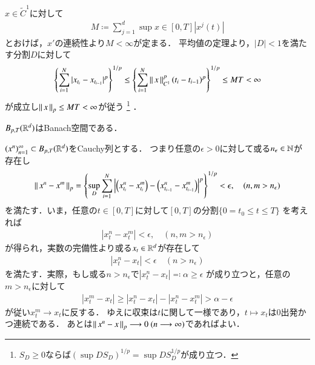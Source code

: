 \begin{prf}
	$x \in \tilde{C}^1$に対して
	\begin{align}
		M \coloneqq \sum_{j=1}^{d} \sup{x \in [0,T]}{|x^j(t)|}
	\end{align}
	とおけば，$x'$の連続性より$M < \infty$が定まる．
	平均値の定理より，$|D| < 1$を満たす分割$D$に対して
	\begin{align}
		\left\{ \sum_{i=1}^{N} |x_{t_i} - x_{t_{i-1}}|^p \right\}^{1/p}
		\leq \left\{ \sum_{i=1}^{N} \left\|\, x\, \right\|_{C^1}^p (t_i - t_{i-1})^p \right\}^{1/p}
		\leq M T < \infty
	\end{align}
	が成立し$\left\|\, x\, \right\|_{p} \leq MT < \infty$が従う
	\footnote{
		$S_D \geq 0$ならば$(\sup{D}S_D)^{1/p} = \sup{D}S_D^{1/p}$が成り立つ．
	}
	．
\end{prf}

\begin{screen}
	\begin{thm}
		$B_{p,T}(\mathbb{R}^d)$はBanach空間である．
	\end{thm}
\end{screen}

\begin{prf}
	$(x^n)_{n=1}^{\infty} \subset B_{p,T}(\mathbb{R}^d)$をCauchy列とする．
	つまり任意の$\epsilon > 0$に対して或る$n_\epsilon \in \mathbb{N}$が存在し
	\begin{align}
		\left\|\, x^n - x^m\, \right\|_{p}
		= \left\{ \operatorname*{sup}_{D} \sum_{i=1}^{N} 
		\left| \left( x^n_{t_i} - x^m_{t_i} \right) 
		- \left(x^n_{t_{i-1}} - x^m_{t_{i-1}} \right) \right|^p \right\}^{1/p} < \epsilon,
		\quad (n,m > n_\epsilon)
	\end{align}
	を満たす．いま，任意の$t \in [0,T]$に対して$[0,T]$の分割$\{0=t_0 \leq t \leq T\}$
	を考えれば
	\begin{align}
		|x^n_t - x^m_t| < \epsilon,
		\quad (n,m > n_\epsilon)
	\end{align}
	が得られ，実数の完備性より或る$x_t \in \mathbb{R}^d$が存在して
	\begin{align}
		|x^n_t - x_t| < \epsilon
		\quad (n > n_\epsilon)
	\end{align}
	を満たす．実際，もし或る$n > n_\epsilon$で$|x^n_t - x_t| \eqqcolon \alpha \geq \epsilon$
	が成り立つと，任意の$m > n_\epsilon$に対して
	\begin{align}
		|x^m_t - x_t| \geq |x^n_t - x_t| - |x^n_t - x^m_t| > \alpha - \epsilon
	\end{align}
	が従い$x^m_t \longrightarrow x_t$に反する．
	ゆえに収束は$t$に関して一様であり，$t \longmapsto x_t$は0出発かつ連続である．
	あとは$\left\|\, x^n - x\, \right\|_{p} \longrightarrow 0\ (n \longrightarrow \infty)$であればよい．
\end{prf}

